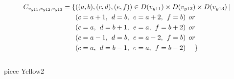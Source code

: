\begin{align*}
C_{v_{y11},v_{y12},v_{y13}}=\{&((a,b),(c,d),(e,f))\in D(v_{y11})\times D(v_{y12})\times D(v_{y13})\mid\\
&(c = a + 1,\hspace{1ex}d = b,\hspace{1ex}e = a + 2, \hspace{1ex}f = b)\hspace{1ex} or\\
&(c = a,\hspace{1ex}d = b+1,\hspace{1ex}e = a, \hspace{1ex}f = b+2)\hspace{1ex} or\\
&(c = a-1,\hspace{1ex}d = b,\hspace{1ex}e = a-2,\hspace{1ex} f = b)\hspace{1ex} or\\
&(c = a,\hspace{1ex}d = b-1,\hspace{1ex}e = a, \hspace{1ex}f = b-2)\hspace{3ex} \}
\end{align*} 
\\ piece Yellow2
